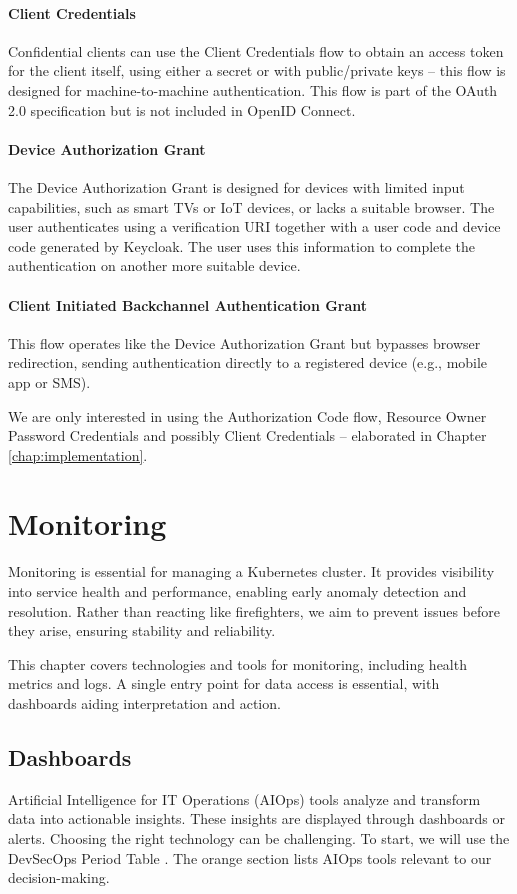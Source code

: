 \paragraph{Client Credentials} Confidential clients can use the Client Credentials flow to obtain an access token for the client itself, using either a secret or with public/private keys -- this flow is designed for machine-to-machine authentication. This flow is part of the OAuth 2.0 specification but is not included in OpenID Connect.

\paragraph{Device Authorization Grant} The Device Authorization Grant is designed for devices with limited input capabilities, such as smart TVs or IoT devices, or lacks a suitable browser. The user authenticates using a verification URI together with a user code and device code generated by Keycloak. The user uses this information to complete the authentication on another more suitable device.

\paragraph{Client Initiated Backchannel Authentication Grant} This flow operates like the Device Authorization Grant but bypasses browser redirection, sending authentication directly to a registered device (e.g., mobile app or SMS).

We are only interested in using the Authorization Code flow, Resource Owner Password Credentials and possibly Client Credentials -- elaborated in Chapter \ref{chap:implementation}.

\section{Monitoring}

Monitoring is essential for managing a Kubernetes cluster. It provides visibility into service health and performance, enabling early anomaly detection and resolution. Rather than reacting like firefighters, we aim to prevent issues before they arise, ensuring stability and reliability.

This chapter covers technologies and tools for monitoring, including health metrics and logs. A single entry point for data access is essential, with dashboards aiding interpretation and action.

\subsection{Dashboards}
Artificial Intelligence for IT Operations (AIOps) tools analyze and transform data into actionable insights. These insights are displayed through dashboards or alerts. Choosing the right technology can be challenging. To start, we will use the DevSecOps Period Table \parencite{digitalai2025devsecops}. The orange section lists AIOps tools relevant to our decision-making.

